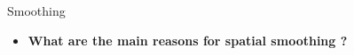 \documentclass{beamer}
\begin{document}
\begin{frame}{Smoothing}
  \begin{itemize}
    \item \textbf{What are the main reasons for spatial smoothing ?}

%
%
%
%
  \end{itemize}
\end{frame}


%
%
%
%
%
\end{document}
